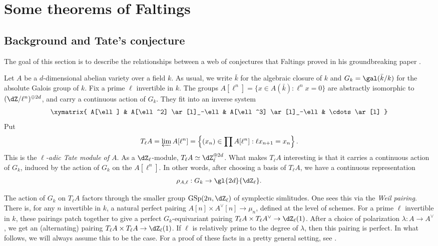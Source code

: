 




\section{Some theorems of Faltings}





\subsection{Background and Tate's conjecture}

The goal of this section is to describe the relationships between a web of 
conjectures that Faltings proved in his groundbreaking paper 
\cite{fa86}. 

Let $A$ be a $d$-dimensional abelian variety over a field $k$. As usual, we 
write $\bar k$ for the algebraic closure of $k$ and $G_k=\gal(\bar k/k)$ for 
the absolute Galois group of $k$. Fix a prime $\ell$ invertible in $k$. The 
groups $A[\ell^n] = \{x\in A(\bar k):\ell^n x=0\}$ are abstractly isomorphic 
to $(\dZ/\ell^n)^{\oplus 2d}$, and carry a continuous action of $G_k$. They 
fit into an inverse system 
\[\xymatrix{
  A[\ell] 
    & A[\ell^2] \ar[l]_-\ell 
    & A[\ell^3] \ar[l]_-\ell 
    & \cdots \ar[l]
}\]
Put 
\[
  T_\ell A = \varprojlim A[\ell^n] = \left\{(x_n)\in \prod A[\ell^n] : \ell x_{n+1} = x_n\right\} \text{.}
\]
This is the \emph{$\ell$-adic Tate module of $A$}. As a $\dZ_\ell$-module, 
$T_\ell A \simeq \dZ_\ell^{\oplus 2 d}$. What makes $T_\ell A$ interesting is 
that it carries a continuous action of $G_k$, induced by the action of $G_k$ 
on the $A[\ell^n]$. In other words, after choosing a basis of $T_\ell A$, we 
have a continuous representation 
\[
  \rho_{A,\ell} : G_k \to \gl{2 d}{\dZ_\ell} \text{.}
\]

The action of $G_k$ on $T_\ell A$ factors through 
the smaller group $\operatorname{GSp}(2 n,\dZ_\ell)$ of symplectic simlitudes. 
One sees this via the \emph{Weil pairing}. There is, for any $n$ invertible in 
$k$, a natural perfect pairing $A[n]\times A^\vee[n] \to \mu_n$, defined at the 
level of schemes. For a prime $\ell$ invertible in $k$, these pairings patch 
together to give a perfect $G_k$-equivariant pairing 
$T_\ell A \times T_\ell A^\vee \to \dZ_\ell(1)$. After a choice of polarization 
$\lambda:A\to A^\vee$, we get an (alternating) pairing 
$T_\ell A\times T_\ell A\to \dZ_\ell(1)$. If $\ell$ is relatively prime to the 
degree of $\lambda$, then this pairing is perfect. In what follows, we will 
always assume this to be the case. For a proof of these facts in a pretty 
general setting, see \cite[11]{gm13}. 

